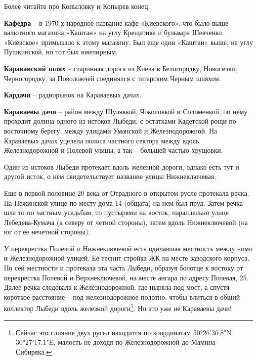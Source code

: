 Более читайте про Копыловку и Копырев конец.\\


\medskip

\textbf{Кафедра} – в 1970-х народное название кафе «Киевского», что было выше валютного магазина «Каштан» на углу Крещатика и бульвара Шевченко. «Киевское» примыкало к этому магазину. Был еще один «Каштан» выше, на углу Пушкинской, но тот был ювелирным.\\

\medskip

\textbf{Караванский шлях} – старинная дорога из Киева в Белогородку, Новоселки, Черногородку, за Поволожчей соединялся с татарским Черным шляхом.\\


\medskip

\textbf{Кардачи} – радиорынок на Караваевых дачах.\\

\medskip

\textbf{Караваевы дачи} – район между Шулявкой, Чоколовкой и Соломенкой, по нему проходит долина одного из истоков Лыбеди, с остатками Кадетской рощи по восточному берегу, между улицами Уманской и Железнодорожной. На Караваевых дачах уцелела полоса частного сектора между вдоль Железнодорожной и Полевой улицы, а так – большей частью хрущовки.

Один из истоков Лыбеди протекает вдоль железной дороги, однако есть тут и другой исток, о нем свидетельствует название улицы Нижнеключевая.

Еще в первой половине 20 века от Отрадного в открытом русле протекала речка. На Нежинской улице по месту дома 14 (общага) на нем был пруд. Затем речка шла то по частным усадьбам, то пустырями на восток, параллельно улице Лебедева-Кумача (к северу от четной стороны), затем вдоль Нижнеключевой (на юг от ее нечетной стороны). 

У перекрестка Полевой и Нижнеключевой есть одичавшая местность между ними и Железнодорожной улицей. Ее теснит стройка ЖК на месте заводского корпуса. По сей местности и протекала эта часть Лыбеди, образуя болотце к востоку от перекрестка Полевой и Верхнеключевой, на месте ангара по адресу Полевая, 25. Далее речка следовала к Железнодорожной, где ныряла под мост, а спустя короткое расстояние – под железнодорожное полотно, чтобы влиться в общий коллектор Лыбеди вдоль железной дороги\footnote{Сейчас это слияние двух русел находится по координатам 50°26'36.8"N 30°27'17.1"E, малость не доходя по Железнодорожной до Мамина-Сибиряка.}. Но это уже не Караваевы дачи!

